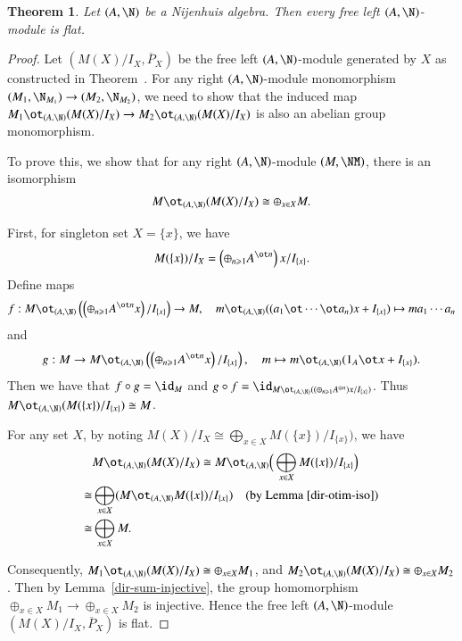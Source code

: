 \documentclass[12pt]{amsart}
\newtheorem{theorem}{Theorem}[section]
\theoremstyle{definition}
\renewcommand\geq{\geqslant}
\begin{document}
\begin{theorem}
Let $(A,\N)$ be a Nijenhuis algebra. Then every free left $(A,\N)$-module is flat.
\end{theorem}

\begin{proof}
Let $(M(X)/I_X,\overline{P}_X)$ be the free left $(A,\N)$-module generated by $X$ as constructed in Theorem~. For any right $(A,\N)$-module monomorphism $(M_1,\N_{M_1})\to (M_2,\N_{M_2})$, we need to show that the induced map $M_1 \ot_{(A,\N)} (M(X)/I_X) \to M_2 \ot_{(A,\N)} (M(X)/I_X)$ is also an abelian group monomorphism.

To prove this, we show that for any right $(A,\N)$-module $(M,\NM)$, there is an isomorphism
\begin{align*}
M \ot_{(A,\N)} (M(X)/I_X) \cong \oplus_{x \in X} M.
\end{align*}

 First, for singleton set $X=\{ x \}$, we have 
\begin{align*}
M(\{ x\})/I_X= \left( \oplus_{n \geq 1} A^{\ot n} \right)x/I_{\{ x\}}.
\end{align*}
Define maps 
\begin{align*}
f: M \ot_{(A,\N)} \left( \left(\oplus_{n \geq 1} A^{\ot n} x\right)/I_{\{ x\}} \right) \to M, \quad m \ot_{(A, \N)} ((a_1 \ot \cdots \ot a_n) x+ I_{\{ x\}}) \mapsto ma_1\cdots a_n
\end{align*}
and
\begin{align*}
g: M \to M \ot_{(A,\N)} \left( \left(\oplus_{n \geq 1} A^{\ot n} x\right)/I_{\{ x\}} \right), \quad m \mapsto m \ot_{(A,\N)} (1_{A} \ot x+ I_{\{x \} }).
\end{align*}
Then we have that $f\circ g=\id_{M}$ and $g \circ f=\id_{M\ot_{(A,\N)}((\oplus_{n\geq 1} A^{\otimes n})x/I_{\{x\}})}$. Thus $M \ot_{(A, \N)} (M(\{ x\})/I_{\{x\} }) \cong M$.

For any set $X$, by noting $M(X)/I_X \cong \bigoplus_{x\in X} M(\{x\})/I_{\{x\}})$, we have
\begin{align*}
& M\ot_{(A,\N)} (M(X)/I_X) \cong M\ot_{(A,\N)} \Big(\bigoplus_{x\in X} M(\{x\})/I_{\{x\}}\Big)\\ 
 \cong & \bigoplus_{x\in X}(M\ot_{(A,\N)} M(\{x\})/I_{\{x\}}) \quad (\text{by Lemma~\ref{dir-otim-iso}}) \\
\cong & \bigoplus_{x\in X} M.
\end{align*}

Consequently, $M_1\ot_{(A,\N)} (M(X)/I_X)\cong \oplus_{x\in X} M_1$, and $M_2\ot_{(A,\N)}(M(X)/I_X)\cong \oplus_{x\in X} M_2$. Then by Lemma~\ref{dir-sum-injective}, the group homomorphism $\oplus_{x\in X} M_1 \to \oplus_{x\in X} M_2$ is injective. Hence the free left $(A,\N)$-module $(M(X)/I_X, \overline{P}_X)$ is flat.
\end{proof}
\end{document}
